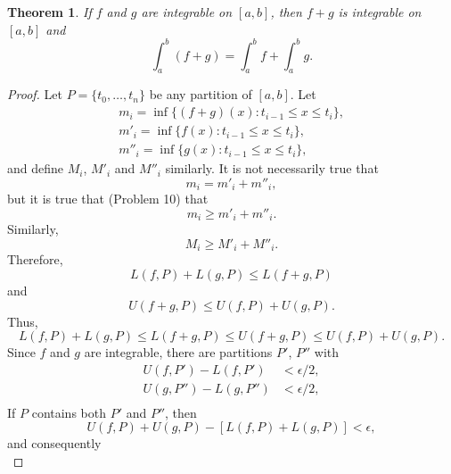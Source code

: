 \documentclass{article}
\newtheorem{theorem}{Theorem}
\begin{document}
\begin{theorem}
  If $f$ and $g$ are integrable on $[a, b]$, then $f + g$ is integrable on $[a,
  b]$ and \begin{equation*}
    \int_a^b (f + g) = \int_a^b f + \int_a^b g.
  \end{equation*}
\end{theorem}

\begin{proof}
  Let $P = \{t_0, \ldots, t_n\}$ be any partition of $[a, b]$. Let
  \begin{align*}
    m_i = \inf\{(f + g)(x): t_{i - 1} \leq x \leq t_i\}, \\
    m'_i = \inf\{f(x): t_{i - 1} \leq x \leq t_i\}, \\
    m''_i = \inf\{g(x): t_{i - 1} \leq x \leq t_i\},
  \end{align*} and define $M_i$, $M'_i$ and $M''_i$ similarly. It is not
  necessarily true that \begin{equation*}
    m_i = m'_i + m''_i,
  \end{equation*} but it is true that (Problem 10) that \begin{equation*}
    m_i \geq m'_i + m''_i.
  \end{equation*} Similarly, \begin{equation*}
    M_i \geq M'_i + M''_i.
  \end{equation*} Therefore, \begin{equation*}
    L(f, P) + L(g, P) \leq L(f + g, P)
  \end{equation*} and \begin{equation*}
    U(f + g, P) \leq U(f, P) + U(g, P).
  \end{equation*} Thus, \begin{equation*}
    L(f, P) + L(g, P) \leq L(f + g, P) \leq U(f + g, P) \leq U(f, P) + U(g, P).
  \end{equation*} Since $f$ and $g$ are integrable, there are partitions $P'$,
  $P''$ with \begin{align*}
    U(f, P') - L(f, P') &< \epsilon/2, \\
    U(g, P'') - L(g, P'') &< \epsilon/2, \\
  \end{align*} If $P$ contains both $P'$ and $P''$, then \begin{equation*}
    U(f, P) + U(g, P) - [L(f, P) + L(g, P)] < \epsilon,
  \end{equation*} and consequently \begin{equation*}

\end{equation*}
\end{proof}
\end{document}
